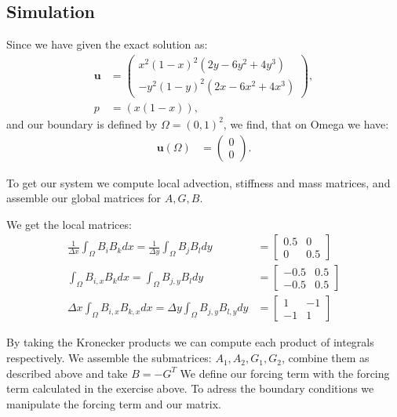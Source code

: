 \subsection{Simulation}
Since we have given the exact solution as:
\begin{align}
    \mathbf{u} &= \begin{pmatrix}
        x^2(1-x)^2(2y-6y^2+4y^3) \\ -y^2(1-y)^2(2x-6x^2+4x^3)
    \end{pmatrix},\\
    p &= (x(1-x)), 
\end{align}
and our boundary is defined by $\Omega = (0,1)^2$, we find, that on Omega we have:
\begin{align}
    \mathbf{u}(\Omega) &= \begin{pmatrix}
        0\\0
    \end{pmatrix}.
\end{align}

To get our system we compute local advection, stiffness and mass matrices, and assemble our global matrices for $A, G, B$.

We get the local matrices:
\begin{align}
    \frac{1}{\Delta x}\int_\Omega B_i B_k dx = \frac{1}{\Delta y}\int_\Omega B_j B_l dy &= \begin{bmatrix}
        0.5 & 0 \\
        0 & 0.5
    \end{bmatrix}\\
    \int_\Omega B_{i,x} B_k dx = \int_\Omega B_{j,y} B_l dy &=\begin{bmatrix}
        -0.5 & 0.5 \\
        -0.5 & 0.5
    \end{bmatrix}\\
    \Delta x \int_\Omega B_{i,x} B_{k,x} dx = \Delta y \int_\Omega B_{j,y} B_{l,y} dy &= \begin{bmatrix}
        1 & -1\\
        -1 & 1
    \end{bmatrix}
\end{align}

By taking the Kronecker products we can compute each product of integrals respectively. We assemble the submatrices: $A_1,A_2,G_1,G_2$, combine them as described above and take $B=-G^T$
We define our forcing term with the forcing term calculated in the exercise above. To adress the boundary conditions we manipulate the forcing term and our matrix. 

